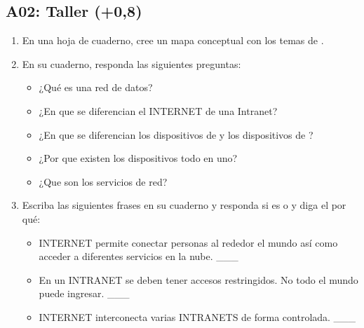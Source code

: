 \documentclass[letterpaper,10pt,spanish]{sphinxmanual}
\begin{document}
\subsection{A02: Taller (+0,8)}
\label{\detokenize{1_guias/10informatica/G1003:a02-taller-0-8}}
\sphinxAtStartPar
{}
\begin{enumerate}
%
\item {} 
\sphinxAtStartPar
En una hoja de cuaderno, cree un mapa conceptual con los temas de .

\item {} 
\sphinxAtStartPar
En su cuaderno, responda las siguientes preguntas:
\begin{itemize}
\item {} 
\sphinxAtStartPar
¿Qué es una red de datos?

\item {} 
\sphinxAtStartPar
¿En que se diferencian el INTERNET de una Intranet?

\item {} 
\sphinxAtStartPar
¿En que se diferencian los dispositivos de  y los dispositivos de ?

\item {} 
\sphinxAtStartPar
¿Por que existen los dispositivos todo en uno?

\item {} 
\sphinxAtStartPar
¿Que son los servicios de red?

\end{itemize}

\item {} 
\sphinxAtStartPar
Escriba las siguientes frases en su cuaderno y responda si es  o  y diga el por qué:
\begin{itemize}
\item {} 
\sphinxAtStartPar
INTERNET permite conectar personas al rededor el mundo así como acceder a diferentes servicios en la nube. \_\_\_

\item {} 
\sphinxAtStartPar
En un INTRANET se deben tener accesos restringidos. No todo el mundo puede ingresar. \_\_\_

\item {} 
\sphinxAtStartPar
INTERNET interconecta varias INTRANETS de forma controlada. \_\_\_


\end{itemize}
\end{enumerate}
\end{document}
